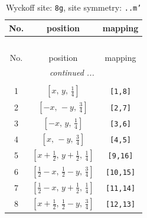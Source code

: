\documentclass[fleqn,8pt]{jsarticle}
\begin{document}
\begin{longtable}{ccc}
\caption{Wyckoff site: {\tt 8g}, site symmetry: {\tt ..m'}}
 \\
 \hline \hline
No. & position & mapping \\ \hline \endfirsthead

\multicolumn{2}{l}{\tablename\ \thetable{}} \\
 \hline \hline
No. & position & mapping \\ \hline \endhead

 \hline \hline
\multicolumn{2}{r}{\footnotesize\it continued ...} \\ \endfoot

 \hline \hline
\multicolumn{2}{r}{} \\ \endlastfoot

1 & $\left[ x,\, y,\, \frac{1}{4} \right]$ & {\tt [1,8]} \\ \hline
2 & $\left[ - x,\, - y,\, \frac{3}{4} \right]$ & {\tt [2,7]} \\ \hline
3 & $\left[ - x,\, y,\, \frac{1}{4} \right]$ & {\tt [3,6]} \\ \hline
4 & $\left[ x,\, - y,\, \frac{3}{4} \right]$ & {\tt [4,5]} \\ \hline
5 & $\left[ x + \frac{1}{2},\, y + \frac{1}{2},\, \frac{1}{4} \right]$ & {\tt [9,16]} \\ \hline
6 & $\left[ \frac{1}{2} - x,\, \frac{1}{2} - y,\, \frac{3}{4} \right]$ & {\tt [10,15]} \\ \hline
7 & $\left[ \frac{1}{2} - x,\, y + \frac{1}{2},\, \frac{1}{4} \right]$ & {\tt [11,14]} \\ \hline
8 & $\left[ x + \frac{1}{2},\, \frac{1}{2} - y,\, \frac{3}{4} \right]$ & {\tt [12,13]} \\
\end{longtable}
\renewcommand{\arraystretch}{1.2}
\end{document}
